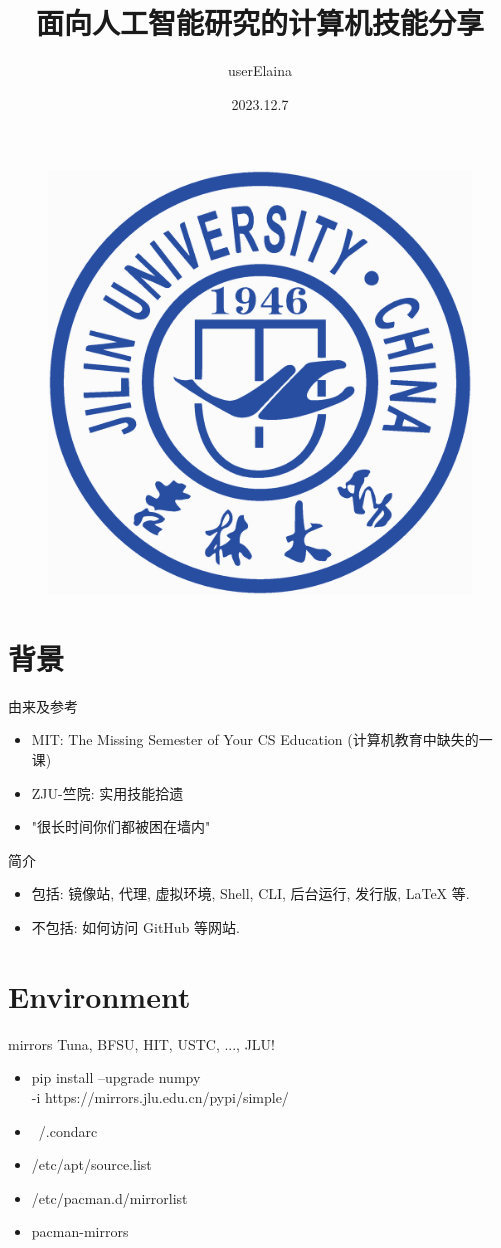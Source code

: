 \documentclass{beamer}
\author{userElaina}
\title{面向人工智能研究的计算机技能分享}
\institute{人工智能学院}
\date{2023.12.7}
\begin{document}
\kaishu
\begin{frame}
    \titlepage
    \begin{figure}[htpb]
        \begin{center}
            \includegraphics[width=0.15\linewidth]{pic/Jilin_University_Logo.eps}
        \end{center}
    \end{figure}
\end{frame}

\begin{frame}
\tableofcontents[sectionstyle=show,subsectionstyle=show/shaded/hide,subsubsectionstyle=show/shaded/hide]
\end{frame}


\section{背景}

\begin{frame}{由来及参考}
    \begin{itemize}
        \item MIT: The Missing Semester of Your CS Education (计算机教育中缺失的一课)
        \item ZJU-竺院: 实用技能拾遗
        \item "很长时间你们都被困在墙内" %
    \end{itemize}
\end{frame}

\begin{frame}{简介}
    \begin{itemize}
        \item 包括: 镜像站, 代理, 虚拟环境, Shell, CLI, 后台运行, 发行版, LaTeX 等.
        \item 不包括: 如何访问 GitHub 等网站.
    \end{itemize}
\end{frame}

\section{Environment}

\begin{frame}{mirrors}
    Tuna, BFSU, HIT, USTC, ..., JLU!
    \begin{itemize}
        \tt
        \item pip install --upgrade numpy \\ -i https://mirrors.jlu.edu.cn/pypi/simple/
        \item ~/.condarc
        \item /etc/apt/source.list
        \item /etc/pacman.d/mirrorlist
        \item pacman-mirrors
    \end{itemize}
\end{frame}
\end{document}
